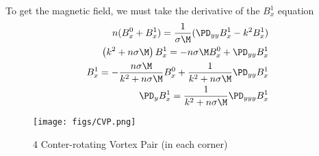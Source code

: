 \documentclass[11pt]{article}
\newcommand{\BfigS}{50em}
\newcommand{\BfigH}{\BfigS}
\newcommand{\BfigW}{\BfigS}
\begin{document}
To get the magnetic field, we must take the derivative of the $B_x^1$ equation
\begin{equation}\begin{aligned}
n (B_x^0+B_x^1) = \frac{1}{\sigma \M} (\PD_{yy} B_x^1-k^2 B_x^1) \\
\left(k^2  + n \sigma \M \right) B_x^1 = - n \sigma \M B_x^0 + \PD_{yy} B_x^1 \\
B_x^1 = -\frac{n \sigma \M}{k^2  + n \sigma \M} B_x^0 + \frac{1}{k^2  + n \sigma \M} \PD_{yy} B_x^1 \\
\PD_y B_x^1 = \frac{1}{k^2  + n \sigma \M} \PD_{yyy} B_x^1 \\
\end{aligned} \end{equation}


\newpage

\begin{figure}[H]
 \centering
  \texttt{[image: figs/CVP.png]}
   \caption[Optional ]{4 Conter-rotating Vortex Pair (in each corner)}
\end{figure}




\end{document}
